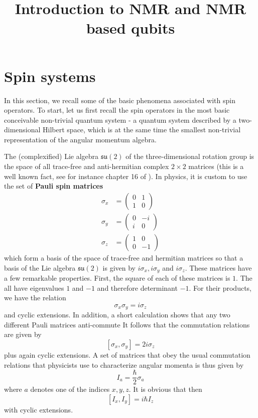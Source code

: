 \documentclass[a4paper, draft]{article}
\title{Introduction to NMR and NMR based qubits}
\theoremstyle{own}
\theoremstyle{remark}
\newcommand{\su}{\mathfrak{su}}
\begin{document}
\maketitle

\section{Spin systems}

In this section, we recall some of the basic phenomena associated with spin operators. To start, let us first recall the spin operators in the most basic conceivable non-trivial quantum system - a quantum system described by a two-dimensional Hilbert space, which is at the same time the smallest non-trivial representation of the angular momentum algebra.

The (complexified) Lie algebra $\su(2)$ of the three-dimensional rotation group is the space of all trace-free and anti-hermitian complex $2 \times 2$ matrices (this is a well known fact, see for instance chapter 16 of \cite{BrianHall}). In physics, it is custom to use the set of {\bf Pauli spin matrices}
\begin{align}
\sigma_x &= \begin{pmatrix} 0 & 1 \\ 1 & 0 \end{pmatrix} \\
\sigma_y &= \begin{pmatrix} 0 & -i \\ i & 0 \end{pmatrix} \\
\sigma_z &= \begin{pmatrix} 1 & 0 \\ 0 & -1 \end{pmatrix} 
\end{align}
which form a basis of the space of trace-free and hermitian matrices so that a basis of the Lie algebra $\su(2)$ is given by $i \sigma_x, i \sigma_y$ and $i \sigma_z$. These matrices have a few remarkable properties. First, the square of each of these matrices is $1$. The all have eigenvalues $1$ and $-1$ and therefore determinant $-1$. For their products, we have the relation
$$
\sigma_x \sigma_y = i \sigma_z
$$
and cyclic extensions. In addition, a short calculation shows that any two different Pauli matrices anti-commute It follows that the commutation relations are given by
$$
[\sigma_x, \sigma_y] = 2 i \sigma_z 
$$
plus again cyclic extensions. A set of matrices that obey the usual commutation relations that physicists use to characterize angular momenta is thus given by
$$
I_a = \frac{\hbar}{2} \sigma_a
$$
where $a$ denotes one of the indices $x, y, z$. It is obvious that then
$$
[I_x, I_y] = i \hbar I_z
$$
with cyclic extensions. 
\end{document}
